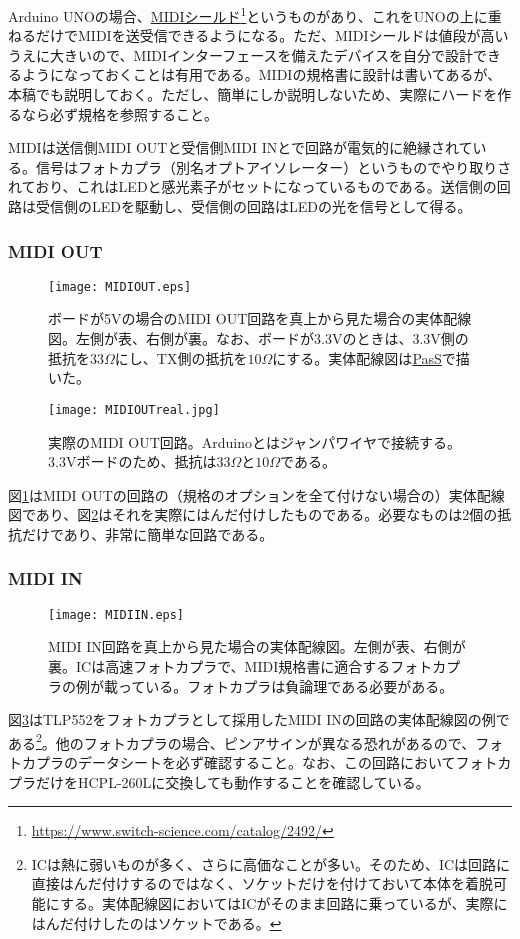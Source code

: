 \documentclass[uplatex, 10pt, dvipdfmx]{jsarticle}
\numberwithin{equation}{section}
\begin{document}
Arduino UNOの場合、\href{https://www.switch-science.com/catalog/2492/}{MIDIシールド}\footnote{\url{https://www.switch-science.com/catalog/2492/}}というものがあり、これをUNOの上に重ねるだけでMIDIを送受信できるようになる。ただ、MIDIシールドは値段が高いうえに大きいので、MIDIインターフェースを備えたデバイスを自分で設計できるようになっておくことは有用である。MIDIの規格書\cite{規格}\cite{3.3V}に設計は書いてあるが、本稿でも説明しておく。ただし、簡単にしか説明しないため、実際にハードを作るなら必ず規格を参照すること。

MIDIは送信側MIDI OUTと受信側MIDI INとで回路が電気的に絶縁されている。信号はフォトカプラ（別名オプトアイソレーター）というものでやり取りされており、これはLEDと感光素子がセットになっているものである。送信側の回路は受信側のLEDを駆動し、受信側の回路はLEDの光を信号として得る。

\subsubsection{MIDI OUT}
\begin{figure}[h]
  \centering
  \texttt{[image: MIDIOUT.eps]}
  \caption{ボードが5Vの場合のMIDI OUT回路を真上から見た場合の実体配線図。左側が表、右側が裏。なお、ボードが3.3Vのときは、3.3V側の抵抗を$33\Omega$にし、TX側の抵抗を$10\Omega$にする。実体配線図は\href{http://uaubn.g2.xrea.com/pass/}{PasS}で描いた。}
  \label{figMIDIOUT}
\end{figure}
\begin{figure}[h]
  \centering
  \texttt{[image: MIDIOUTreal.jpg]}
  \caption{実際のMIDI OUT回路。Arduinoとはジャンパワイヤで接続する。3.3Vボードのため、抵抗は$33\Omega$と$10\Omega$である。}
  \label{figMIDIOUTreal}
\end{figure}
図\ref{figMIDIOUT}はMIDI OUTの回路の（規格のオプションを全て付けない場合の）実体配線図であり、図\ref{figMIDIOUTreal}はそれを実際にはんだ付けしたものである。必要なものは2個の抵抗だけであり、非常に簡単な回路である。

\subsubsection{MIDI IN}
\begin{figure}[h]
  \centering
  \texttt{[image: MIDIIN.eps]}
  \caption{MIDI IN回路を真上から見た場合の実体配線図。左側が表、右側が裏。ICは高速フォトカプラで、MIDI規格書\cite{規格}に適合するフォトカプラの例が載っている。フォトカプラは負論理である必要がある。}
  \label{figMIDIIN}
\end{figure}
図\ref{figMIDIIN}はTLP552をフォトカプラとして採用したMIDI INの回路の実体配線図の例である\footnote{ICは熱に弱いものが多く、さらに高価なことが多い。そのため、ICは回路に直接はんだ付けするのではなく、ソケットだけを付けておいて本体を着脱可能にする。実体配線図においてはICがそのまま回路に乗っているが、実際にはんだ付けしたのはソケットである。}\cite{TLP552}。他のフォトカプラの場合、ピンアサインが異なる恐れがあるので、フォトカプラのデータシートを必ず確認すること。なお、この回路においてフォトカプラだけをHCPL-260Lに交換しても動作することを確認している。
\end{document}
